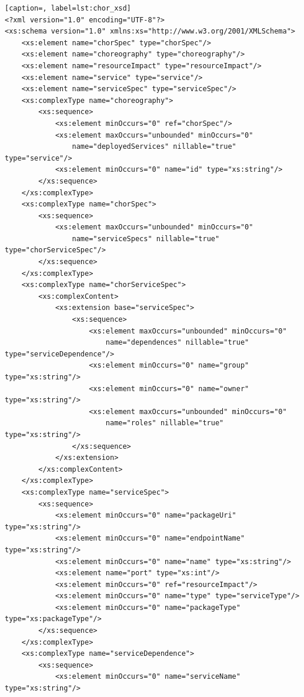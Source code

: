 \documentclass[a4paper, 10pt]{article}
\begin{document}
{\footnotesize

\lstset{language=XML}

\begin{lstlisting}[caption=, label=lst:chor_xsd]
<?xml version="1.0" encoding="UTF-8"?>
<xs:schema version="1.0" xmlns:xs="http://www.w3.org/2001/XMLSchema">
    <xs:element name="chorSpec" type="chorSpec"/>
    <xs:element name="choreography" type="choreography"/>
    <xs:element name="resourceImpact" type="resourceImpact"/>
    <xs:element name="service" type="service"/>
    <xs:element name="serviceSpec" type="serviceSpec"/>
    <xs:complexType name="choreography">
        <xs:sequence>
            <xs:element minOccurs="0" ref="chorSpec"/>
            <xs:element maxOccurs="unbounded" minOccurs="0"
                name="deployedServices" nillable="true" type="service"/>
            <xs:element minOccurs="0" name="id" type="xs:string"/>
        </xs:sequence>
    </xs:complexType>
    <xs:complexType name="chorSpec">
        <xs:sequence>
            <xs:element maxOccurs="unbounded" minOccurs="0"
                name="serviceSpecs" nillable="true" type="chorServiceSpec"/>
        </xs:sequence>
    </xs:complexType>
    <xs:complexType name="chorServiceSpec">
        <xs:complexContent>
            <xs:extension base="serviceSpec">
                <xs:sequence>
                    <xs:element maxOccurs="unbounded" minOccurs="0"
                        name="dependences" nillable="true" type="serviceDependence"/>
                    <xs:element minOccurs="0" name="group" type="xs:string"/>
                    <xs:element minOccurs="0" name="owner" type="xs:string"/>
                    <xs:element maxOccurs="unbounded" minOccurs="0"
                        name="roles" nillable="true" type="xs:string"/>
                </xs:sequence>
            </xs:extension>
        </xs:complexContent>
    </xs:complexType>
    <xs:complexType name="serviceSpec">
        <xs:sequence>
            <xs:element minOccurs="0" name="packageUri" type="xs:string"/>
            <xs:element minOccurs="0" name="endpointName" type="xs:string"/>
            <xs:element minOccurs="0" name="name" type="xs:string"/>
            <xs:element name="port" type="xs:int"/>
            <xs:element minOccurs="0" ref="resourceImpact"/>
            <xs:element minOccurs="0" name="type" type="serviceType"/>
            <xs:element minOccurs="0" name="packageType" type="xs:packageType"/>
        </xs:sequence>
    </xs:complexType>
    <xs:complexType name="serviceDependence">
        <xs:sequence>
            <xs:element minOccurs="0" name="serviceName" type="xs:string"/>

\end{lstlisting}}
\end{document}
